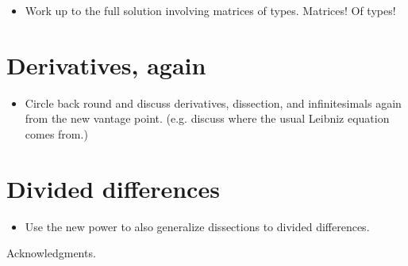 \documentclass[authoryear,preprint]{sigplanconf}
\begin{document}
\begin{itemize}
\item Work up to the full solution involving matrices of types.
  Matrices!  Of types!
\end{itemize}

\section{Derivatives, again}
\label{sec:derivatives-again}

\begin{itemize}
\item Circle back round and discuss derivatives, dissection, and
  infinitesimals again from the new vantage point.  (e.g. discuss
  where the usual Leibniz equation comes from.)
\end{itemize}

\section{Divided differences}
\label{sec:divided-differences}

\begin{itemize}
\item Use the new power to also generalize dissections to divided
  differences.
\end{itemize}

\acks

Acknowledgments.



\end{document}
